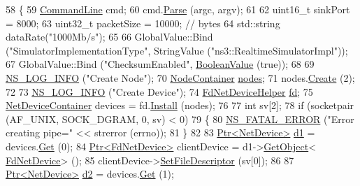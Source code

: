 \begin{DoxyCode}
58 \{
59   \hyperlink{classns3_1_1CommandLine}{CommandLine} cmd;
60   cmd.\hyperlink{classns3_1_1CommandLine_a5c10b85b3207e5ecb48d907966923156}{Parse} (argc, argv);
61   
62   uint16\_t sinkPort = 8000;
63   uint32\_t packetSize = 10000; \textcolor{comment}{// bytes}
64   std::string dataRate(\textcolor{stringliteral}{"1000Mb/s"});
65 
66   GlobalValue::Bind (\textcolor{stringliteral}{"SimulatorImplementationType"}, StringValue (\textcolor{stringliteral}{"ns3::RealtimeSimulatorImpl"}));
67   GlobalValue::Bind (\textcolor{stringliteral}{"ChecksumEnabled"}, \hyperlink{classns3_1_1BooleanValue}{BooleanValue} (\textcolor{keyword}{true}));
68 
69   \hyperlink{group__logging_gafbd73ee2cf9f26b319f49086d8e860fb}{NS\_LOG\_INFO} (\textcolor{stringliteral}{"Create Node"});
70   \hyperlink{classns3_1_1NodeContainer}{NodeContainer} \hyperlink{visualizer-ideas_8txt_a3e1b3808014a2c68ab0cd0182e041be2}{nodes};
71   nodes.\hyperlink{classns3_1_1NodeContainer_a787f059e2813e8b951cc6914d11dfe69}{Create} (2);
72 
73   \hyperlink{group__logging_gafbd73ee2cf9f26b319f49086d8e860fb}{NS\_LOG\_INFO} (\textcolor{stringliteral}{"Create Device"});
74   \hyperlink{classns3_1_1FdNetDeviceHelper}{FdNetDeviceHelper} \hyperlink{lte_2model_2fading-traces_2fading__trace__generator_8m_a44f21d5190b5a6df8089f54799628d7e}{fd};
75   \hyperlink{classns3_1_1NetDeviceContainer}{NetDeviceContainer} devices = fd.\hyperlink{classns3_1_1FdNetDeviceHelper_af70d55cbb4f6411c33cacb84eb651ad5}{Install} (nodes);
76 
77   \textcolor{keywordtype}{int} sv[2];
78   \textcolor{keywordflow}{if} (socketpair (AF\_UNIX, SOCK\_DGRAM, 0, sv) < 0)
79     \{
80       \hyperlink{group__fatal_ga5131d5e3f75d7d4cbfd706ac456fdc85}{NS\_FATAL\_ERROR} (\textcolor{stringliteral}{"Error creating pipe="} << strerror (errno));
81     \}
82 
83   \hyperlink{classns3_1_1Ptr}{Ptr<NetDevice>} \hyperlink{lte__link__budget__interference_8m_ab5ca0c44c6f0a063a5219b3749db661f}{d1} = devices.\hyperlink{classns3_1_1NetDeviceContainer_a677d62594b5c9d2dea155cc5045f4d0b}{Get} (0);
84   \hyperlink{classns3_1_1Ptr}{Ptr<FdNetDevice>} clientDevice = d1->\hyperlink{classns3_1_1Object_a13e18c00017096c8381eb651d5bd0783}{GetObject}<
      \hyperlink{classns3_1_1FdNetDevice}{FdNetDevice}> ();
85   clientDevice->\hyperlink{classns3_1_1FdNetDevice_ac72fff1b3d44824245645a9bcb37c709}{SetFileDescriptor} (sv[0]);
86 
87   \hyperlink{classns3_1_1Ptr}{Ptr<NetDevice>} \hyperlink{lte__cqi__generation_8m_a479b78c01efbe4664b402a300da492f7}{d2} = devices.\hyperlink{classns3_1_1NetDeviceContainer_a677d62594b5c9d2dea155cc5045f4d0b}{Get} (1);

\end{DoxyCode}
